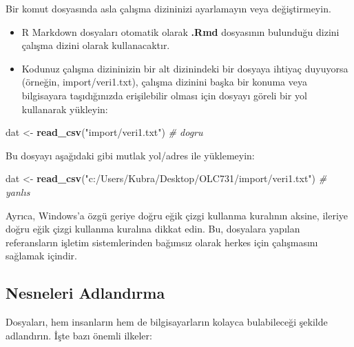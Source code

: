 \documentclass[
  oneside]{book}
\newenvironment{Shaded}{\begin{snugshade}}{\end{snugshade}}
\newcommand{\CommentTok}[1]{\textcolor[rgb]{0.56,0.35,0.01}{\textit{#1}}}
\newcommand{\FunctionTok}[1]{\textcolor[rgb]{0.13,0.29,0.53}{\textbf{#1}}}
\newcommand{\NormalTok}[1]{#1}
\newcommand{\OtherTok}[1]{\textcolor[rgb]{0.56,0.35,0.01}{#1}}
\newcommand{\StringTok}[1]{\textcolor[rgb]{0.31,0.60,0.02}{#1}}
\begin{document}
\begin{warning}
Bir komut dosyasında asla çalışma dizininizi ayarlamayın veya değiştirmeyin.

\end{warning}

\begin{itemize}
\item
  R Markdown dosyaları otomatik olarak \textbf{.Rmd} dosyasının bulunduğu dizini çalışma dizini olarak kullanacaktır.
\item
  Kodunuz çalışma dizininizin bir alt dizinindeki bir dosyaya ihtiyaç duyuyorsa (örneğin, import/veri1.txt), çalışma dizinini başka bir konuma veya bilgisayara taşıdığınızda erişilebilir olması için dosyayı göreli bir yol kullanarak yükleyin:
\end{itemize}

\begin{Shaded}
\begin{Highlighting}[]
\NormalTok{dat }\OtherTok{\textless{}{-}} \FunctionTok{read\_csv}\NormalTok{(}\StringTok{"import/veri1.txt"}\NormalTok{)  }\CommentTok{\# dogru}
\end{Highlighting}
\end{Shaded}

Bu dosyayı aşağıdaki gibi mutlak yol/adres ile yüklemeyin:

\begin{Shaded}
\begin{Highlighting}[]
\NormalTok{dat }\OtherTok{\textless{}{-}} \FunctionTok{read\_csv}\NormalTok{(}\StringTok{"c:/Users/Kubra/Desktop/OLC731/import/veri1.txt"}\NormalTok{)  }\CommentTok{\# yanlıs}
\end{Highlighting}
\end{Shaded}

\begin{info}
Ayrıca, Windows'a özgü geriye doğru eğik çizgi kullanma kuralının aksine, ileriye doğru eğik çizgi kullanma kuralına dikkat edin. Bu, dosyalara yapılan referansların işletim sistemlerinden bağımsız olarak herkes için çalışmasını sağlamak içindir.

\end{info}

\hypertarget{nesneleri-adlandux131rma}{%
\subsection{Nesneleri Adlandırma}\label{nesneleri-adlandux131rma}}

Dosyaları, hem insanların hem de bilgisayarların kolayca bulabileceği şekilde adlandırın. İşte bazı önemli ilkeler:
\end{document}

